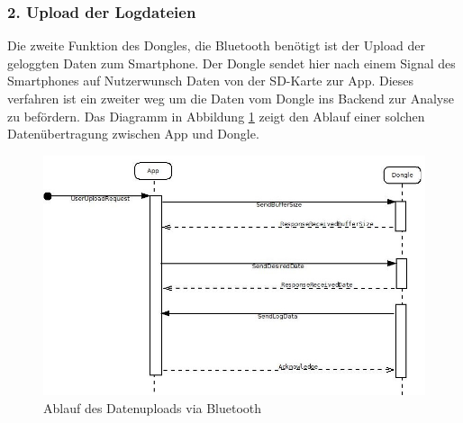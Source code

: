 \subsubsection*{2. Upload der Logdateien}
Die zweite Funktion des Dongles, die Bluetooth benötigt ist der Upload der geloggten Daten zum Smartphone. Der Dongle sendet hier nach einem Signal des Smartphones auf Nutzerwunsch Daten von der SD-Karte zur App. Dieses verfahren ist ein zweiter weg um die Daten vom Dongle ins Backend zur Analyse zu befördern. Das Diagramm in Abbildung \ref{fig:DataUpload} zeigt den Ablauf einer solchen Datenübertragung zwischen App und Dongle. 
\begin{figure}[h]
  \begin{center}
    \includegraphics[scale=0.6]{./img/DataUploadSequence.jpg}
    \caption{Ablauf des Datenuploads via Bluetooth}
    \label{fig:DataUpload}
  \end{center}
\end{figure}

